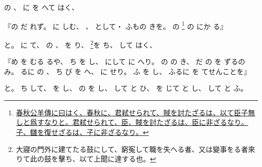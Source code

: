 \documentclass[a4paper,12pt]{article}
\begin{document}
%
の%
、%
に%
を%
へて%
はく、%
\begin{quoting}
『の%
%
だ%
れず。%
に%
しむ、%
、%
として・%
ふもの%
きを。%
の%
\footnote{\href{https://ctext.org/gongyang-zhuan/yin-gong-shi-yi-nian/zh?searchu=\%E5\%90\%9B\%E5\%BC\%92\%20\%E8\%B3\%8A\%E4\%B8\%8D\%E8\%A8\%8E\%20\%E4\%BB\%A5\%E7\%82\%BA\%E7\%84\%A1\%E8\%87\%A3\%E5\%AD\%90\%E4\%B9\%9F\%20\%E8\%87\%A3\%E4\%B8\%8D\%E8\%A8\%8E\%E8\%B3\%8A\%20\%E9\%9D\%9E\%E8\%87\%A3\%E4\%B9\%9F\%20\%E5\%AD\%90\%E4\%B8\%8D\%E5\%BE\%A9\%E8\%AE\%8E\%20\%E9\%9D\%9E\%E5\%AD\%90\%E4\%B9\%9F&searchmode=showall\#result}{春秋公羊傳に曰はく、春秋に、君弒せられて、賊を討たざるは、以て臣子無しと爲すなりと。君弒せられて、臣、賊を討たざるは、臣に非ざるなり。子、讎を復せざるは、子に非ざるなり。}}%
の%
%
にか%
る』
\end{quoting}
と。%
に%
て、%
の%
%
、%
を%
り、%
\footnote{大寢の門外に建てたる鼓にして、窮寃して職を失へる者、又は變事をる者來りて此の鼓を擊ち、以て上聞に達する也。}を%
ち、%
して%
はく、%
\begin{quoting}
『め%
を%
むる%
%
るや、%
%
%
ち%
を%
し、%
%
にして%
に%
へり。%
の%
の%
き、%
だ%
の%
を%
ずるのみ。%
るに%
の%
%
、%
ち%
%
%
び%
を%
へ、%
に%
せり。%
ふ%
を%
し、%
ふるに%
を%
てせんことを』
\end{quoting}
と。%
ち%
して、%
を%
し、%
の%
を%
し、%
して%
と%
ひ、%
を%
じて%
と%
し、%
して%
と%
ふ。%
\end{document}
